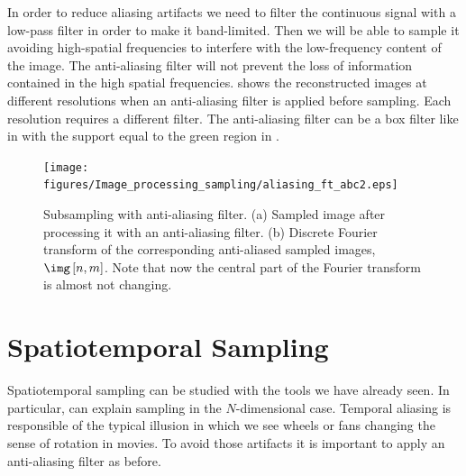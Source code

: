 In order to reduce aliasing artifacts we need to filter the continuous signal with a low-pass filter in order to make it band-limited. Then we will be able to sample it avoiding high-spatial frequencies to interfere with the low-frequency content of the image. The anti-aliasing filter will not prevent the loss of information contained in the high spatial frequencies.   shows the reconstructed images at different resolutions when an anti-aliasing filter is applied before sampling. Each resolution requires a different filter. The anti-aliasing filter can be a box filter like in \eqn{\ref{eq:boxfilterFT}} with the support equal to the green region in .

\begin{figure}
    \texttt{[image: figures/Image\_processing\_sampling/aliasing\_ft\_abc2.eps]}
    \caption{Subsampling with anti-aliasing filter. (a) Sampled image after processing it with an anti-aliasing filter. (b) Discrete Fourier transform of the corresponding anti-aliased sampled images, $\img\left[n,m\right]$. Note that now the central part of the Fourier transform is almost not changing.
    }
    \label{fig:aliasingFTzebra2}
\end{figure}


%
%
%
%
%
%
%
%
%
%


\section{Spatiotemporal Sampling}


Spatiotemporal sampling can be studied with the tools we have already seen. In particular, \eqn{\ref{eq:genericsampling}} can explain sampling in the $N$-dimensional case. Temporal aliasing is responsible of the typical illusion in which we see wheels or fans changing the sense of rotation in movies. To avoid those artifacts it is important to apply an anti-aliasing filter as before.

